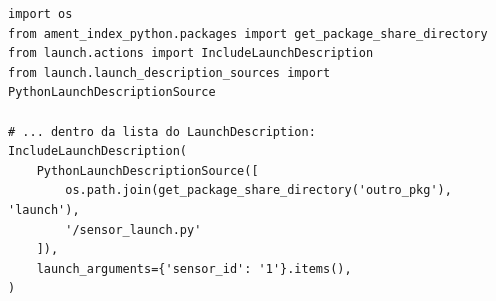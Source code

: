 \documentclass[preview,border=2pt]{standalone}
\begin{document}
\begin{lstlisting}[style=pythonstyle]
import os
from ament_index_python.packages import get_package_share_directory
from launch.actions import IncludeLaunchDescription
from launch.launch_description_sources import PythonLaunchDescriptionSource

# ... dentro da lista do LaunchDescription:
IncludeLaunchDescription(
    PythonLaunchDescriptionSource([
        os.path.join(get_package_share_directory('outro_pkg'), 'launch'),
        '/sensor_launch.py'
    ]),
    launch_arguments={'sensor_id': '1'}.items(),
)
\end{lstlisting}
\end{document}
